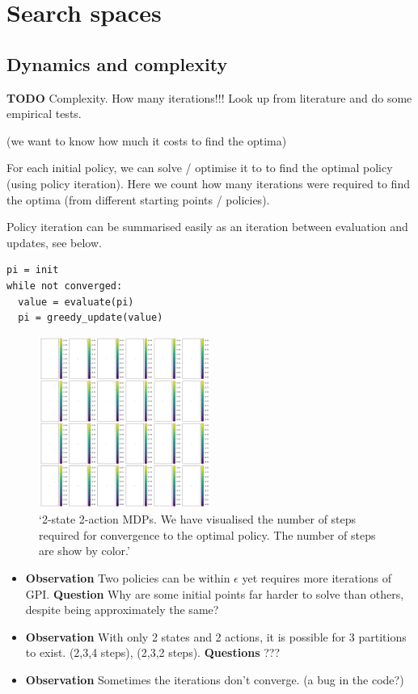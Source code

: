 \section{Search spaces}
\subsection{Dynamics and complexity}

\textbf{TODO} Complexity. How many iterations!!! Look up from literature
and do some empirical tests.

(we want to know how much it costs to find the optima)

For each initial policy, we can solve / optimise it to to find the
optimal policy (using policy iteration). Here we count how many
iterations were required to find the optima (from different starting
points / policies).

Policy iteration can be summarised easily as an iteration between
evaluation and updates, see below.

\begin{verbatim}
pi = init
while not converged:
  value = evaluate(pi)
  pi = greedy_update(value)
\end{verbatim}

\begin{figure}
\centering
\includegraphics[width=0.5\textwidth,height=0.5\textheight]{../../pictures/figures/gpi-partitions.png}
\caption{`2-state 2-action MDPs. We have visualised the number of steps
required for convergence to the optimal policy. The number of steps are
show by color.'}
\end{figure}

\begin{itemize}
\item
  \textbf{Observation} Two policies can be within \(\epsilon\) yet
  requires more iterations of GPI. \textbf{Question} Why are some
  initial points far harder to solve than others, despite being
  approximately the same?
\item
  \textbf{Observation} With only 2 states and 2 actions, it is possible
  for 3 partitions to exist. (2,3,4 steps), (2,3,2 steps).
  \textbf{Questions} ???
\item
  \textbf{Observation} Sometimes the iterations don't converge. (a bug
  in the code?)
\end{itemize}

